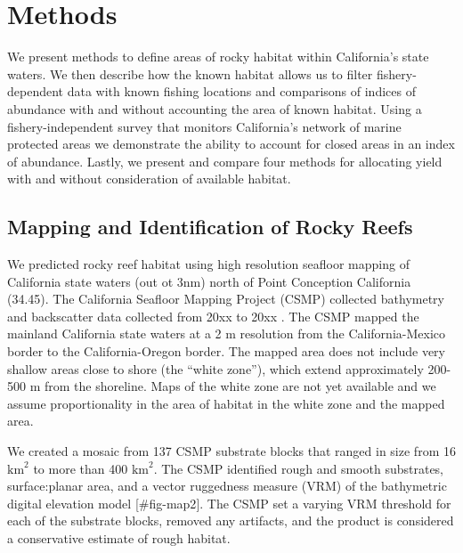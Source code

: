 \documentclass[
  12pt,
  authoryear,
  preprint,
  3p]{elsarticle}
\begin{document}
\hypertarget{methods}{%
\section{Methods}\label{methods}}

We present methods to define areas of rocky habitat within California's
state waters. We then describe how the known habitat allows us to filter
fishery-dependent data with known fishing locations and comparisons of
indices of abundance with and without accounting the area of known
habitat. Using a fishery-independent survey that monitors California's
network of marine protected areas we demonstrate the ability to account
for closed areas in an index of abundance. Lastly, we present and
compare four methods for allocating yield with and without consideration
of available habitat.

\hypertarget{mapping-and-identification-of-rocky-reefs}{%
\subsection{Mapping and Identification of Rocky
Reefs}\label{mapping-and-identification-of-rocky-reefs}}

We predicted rocky reef habitat using high resolution seafloor mapping
of California state waters (out ot 3nm) north of Point Conception
California (34.45). The California Seafloor Mapping Project (CSMP)
collected bathymetry and backscatter data collected from 20xx to 20xx
\citep{Golden:2013:CSW, CSUMB:2014:CSM}. The CSMP mapped the mainland
California state waters at a 2 m resolution from the California-Mexico
border to the California-Oregon border. The mapped area does not include
very shallow areas close to shore (the ``white zone''), which extend
approximately 200-500 m from the shoreline. Maps of the white zone are
not yet available and we assume proportionality in the area of habitat
in the white zone and the mapped area.

We created a mosaic from 137 CSMP substrate blocks that ranged in size
from 16 \(\mathrm{km}^2\) to more than 400 \(\mathrm{km}^2\). The CSMP
identified rough and smooth substrates, surface:planar area, and a
vector ruggedness measure (VRM) of the bathymetric digital elevation
model {[}\#fig-map2{]}. The CSMP set a varying VRM threshold for each of
the substrate blocks, removed any artifacts, and the product is
considered a conservative estimate of rough habitat.
\end{document}
